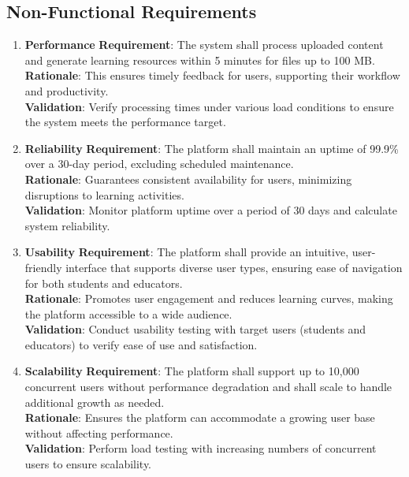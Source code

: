\documentclass[12pt]{article}
\begin{document}
\subsection{Non-Functional Requirements}
\begin{enumerate}

    \item \textbf{Performance}  
    \textbf{Requirement}: The system shall process uploaded content and generate learning resources within 5 minutes for files up to 100 MB. \\
    \textbf{Rationale}: This ensures timely feedback for users, supporting their workflow and productivity. \\
    \textbf{Validation}: Verify processing times under various load conditions to ensure the system meets the performance target.

    \item \textbf{Reliability}  
    \textbf{Requirement}: The platform shall maintain an uptime of 99.9\% over a 30-day period, excluding scheduled maintenance. \\
    \textbf{Rationale}: Guarantees consistent availability for users, minimizing disruptions to learning activities. \\
    \textbf{Validation}: Monitor platform uptime over a period of 30 days and calculate system reliability.

    \item \textbf{Usability}  
    \textbf{Requirement}: The platform shall provide an intuitive, user-friendly interface that supports diverse user types, ensuring ease of navigation for both students and educators. \\
    \textbf{Rationale}: Promotes user engagement and reduces learning curves, making the platform accessible to a wide audience. \\
    \textbf{Validation}: Conduct usability testing with target users (students and educators) to verify ease of use and satisfaction.

    \item \textbf{Scalability}  
    \textbf{Requirement}: The platform shall support up to 10,000 concurrent users without performance degradation and shall scale to handle additional growth as needed. \\
    \textbf{Rationale}: Ensures the platform can accommodate a growing user base without affecting performance. \\
    \textbf{Validation}: Perform load testing with increasing numbers of concurrent users to ensure scalability.


\end{enumerate}
\end{document}
